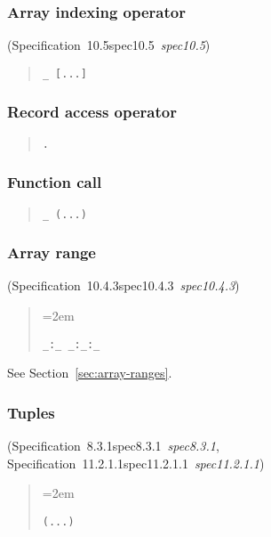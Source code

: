 \documentclass[10pt,b5paper]{article}
\def\specrefx#1#2{Specification~#1\ifx\relax#2\relax{}\else~{\it{}#2}\fi}
\def\specref#1{\specrefx{#1}{\csname spec#1\endcsname}}
\begin{document}
\subsubsection*{Array indexing operator}
(\specref{10.5}\/)

\begin{quote}
\begin{verbatim}
_ [...]
\end{verbatim}
\end{quote}

\subsubsection*{Record access operator}

\begin{quote}
\begin{verbatim}
.
\end{verbatim}
\end{quote}

\subsubsection*{Function call}

\begin{quote}
\begin{verbatim}
_ (...)
\end{verbatim}
\end{quote}

\subsubsection*{Array range}
(\specref{10.4.3}\/)


\begin{quote}
\spaceskip=2em
\begin{verbatim}
_:_ _:_:_
\end{verbatim}
\end{quote}

\noindent See Section~\ref{sec:array-ranges}.

\subsubsection*{Tuples}
(\specref{8.3.1}, \specref{11.2.1.1}\/)

\begin{quote}
\spaceskip=2em
\begin{verbatim}
(...)
\end{verbatim}
\end{quote}
\end{document}
